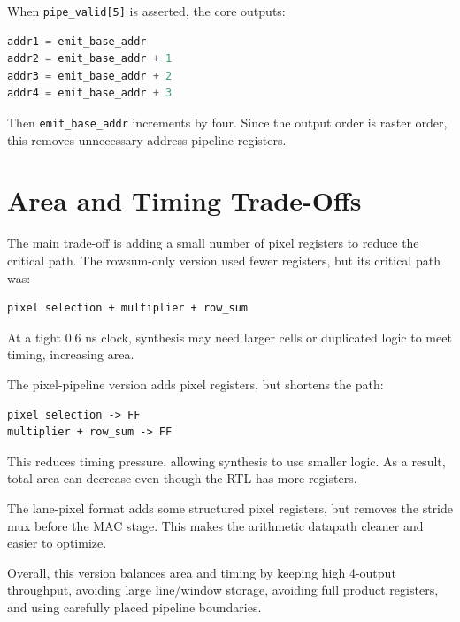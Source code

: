 \documentclass[11pt]{article}
\begin{document}
When \texttt{pipe\_valid[5]} is asserted, the core outputs:

\begin{lstlisting}[language=Verilog]
addr1 = emit_base_addr
addr2 = emit_base_addr + 1
addr3 = emit_base_addr + 2
addr4 = emit_base_addr + 3
\end{lstlisting}

Then \texttt{emit\_base\_addr} increments by four. Since the output order is raster order, this removes unnecessary address pipeline registers.

\section*{Area and Timing Trade-Offs}

The main trade-off is adding a small number of pixel registers to reduce the critical path. The rowsum-only version used fewer registers, but its critical path was:

\begin{lstlisting}
pixel selection + multiplier + row_sum
\end{lstlisting}

At a tight 0.6 ns clock, synthesis may need larger cells or duplicated logic to meet timing, increasing area.

The pixel-pipeline version adds pixel registers, but shortens the path:

\begin{lstlisting}
pixel selection -> FF
multiplier + row_sum -> FF
\end{lstlisting}

This reduces timing pressure, allowing synthesis to use smaller logic. As a result, total area can decrease even though the RTL has more registers.

The lane-pixel format adds some structured pixel registers, but removes the stride mux before the MAC stage. This makes the arithmetic datapath cleaner and easier to optimize.

Overall, this version balances area and timing by keeping high 4-output throughput, avoiding large line/window storage, avoiding full product registers, and using carefully placed pipeline boundaries.
\end{document}

